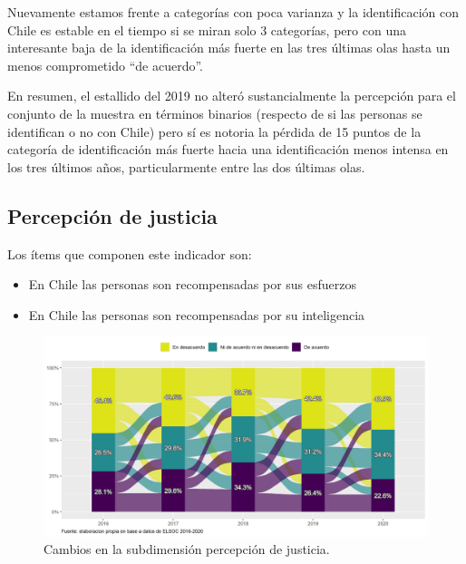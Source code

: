 \documentclass[
  12pt,
]{book}
\begin{document}
Nuevamente estamos frente a categorías con poca varianza y la identificación con Chile es estable en el tiempo si se miran solo 3 categorías, pero con una interesante baja de la identificación más fuerte en las tres últimas olas hasta un menos comprometido ``de acuerdo''.

En resumen, el estallido del 2019 no alteró sustancialmente la percepción para el conjunto de la muestra en términos binarios (respecto de si las personas se identifican o no con Chile) pero sí es notoria la pérdida de 15 puntos de la categoría de identificación más fuerte hacia una identificación menos intensa en los tres últimos años, particularmente entre las dos últimas olas.

\hypertarget{percepciuxf3n-de-justicia}{%
\subsection{Percepción de justicia}\label{percepciuxf3n-de-justicia}}

Los ítems que componen este indicador son:

\begin{itemize}
\item
  En Chile las personas son recompensadas por sus esfuerzos
\item
  En Chile las personas son recompensadas por su inteligencia
\end{itemize}

\begin{figure}[H]

{\centering \includegraphics[width=1\linewidth,height=1\textheight]{output/graphs/alluvial_justicia} 

}

\caption{Cambios en la subdimensión percepción de justicia.}\label{fig:alluvial-justicia}
\end{figure}
\end{document}

